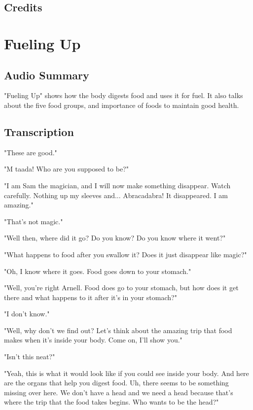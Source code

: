 \subsection{Credits}

\section{Fueling Up}

\subsection{Audio Summary}

"Fueling Up" shows how the body digests food and uses it for fuel. It also talks about the five food groups, and importance of foods to maintain good health.

\subsection{Transcription}

"These are good."

"M taada! Who are you supposed to be?"

"I am Sam the magician, and I will now make something disappear. Watch carefully. Nothing up my sleeves and... Abracadabra! It disappeared. I am amazing."

"That's not magic."

"Well then, where did it go? Do you know? Do you know where it went?"

"What happens to food after you swallow it? Does it just disappear like magic?"

"Oh, I know where it goes. Food goes down to your stomach."

"Well, you're right Arnell. Food does go to your stomach, but how does it get there and what happens to it after it's in your stomach?"

"I don't know."

"Well, why don't we find out? Let's think about the amazing trip that food makes when it's inside your body. Come on, I'll show you."

"Isn't this neat?"

"Yeah, this is what it would look like if you could see inside your body. And here are the organs that help you digest food. Uh, there seems to be something missing over here. We don't have a head and we need a head because that's where the trip that the food takes begins. Who wants to be the head?"

